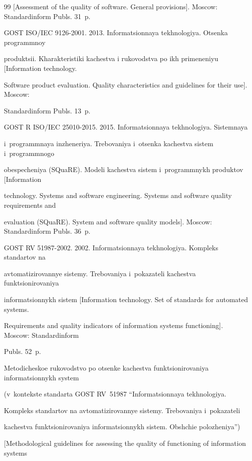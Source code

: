 {{\begin{thebibliography}{99}
[Assessment of the quality of software. General provisions]. Moscow: Standardinform Publs. 31~p.


GOST ISO\!/\!IEC 9126-2001. 2013. Informatsionnaya tekhnologiya. Otsenka programmnoy 

produktsii. Kharakteristiki kachestva i rukovodstva po ikh primeneniyu [Information technology. 

Software product evaluation. Quality characteristics and guidelines for their use]. Moscow: 

Standardinform Publs. 13~p.


GOST R ISO\!/\!IEC 25010-2015. 2015. Informatsionnaya tekhnologiya. Sistemnaya 

i~programmnaya inzheneriya. Trebovaniya i~otsenka kachestva sistem i~programmnogo 

obespecheniya (SQuaRE). Modeli kachestva sistem i~programmnykh produktov [Information 

technology. Systems and software engineering. Systems and software quality requirements and 

evaluation (SQuaRE). System and software quality models]. Moscow: Standardinform Publs. 36~p.


GOST RV 51987-2002. 2002. Informatsionnaya tekhnologiya. Kompleks standartov na 

avtomatizirovannye sistemy. Trebovaniya i~pokazateli kachestva funktsionirovaniya 

informatsionnykh sistem [Information technology. Set of standards for automated systems. 

Requirements and quality indicators of information systems functioning]. Moscow: Standardinform 

Publs. 52~p.


Metodicheskoe rukovodstvo po otsenke kachestva funktsionirovaniya informatsionnykh system 

(v~kontekste standarta GOST RV~51987 ``Informatsionnaya tekhnologiya. 

Kompleks standartov na avtomatizirovannye sistemy. Trebovaniya i~pokazateli 

kachestva funktsionirovaniya informatsionnykh sistem. Obshchie polozheniya'')

[Methodological guidelines for assessing the quality of functioning of information systems


\end{thebibliography}}}

